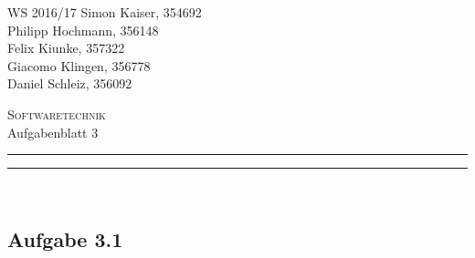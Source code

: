 \documentclass[a4paper,graphics,11pt]{article}
\newcommand\aufgabe[1]{\subsection*{Aufgabe #1}}
\newcommand\aufgabenteil[1]{\subsubsection*{#1}}
\begin{document}
\noindent WS 2016/17        \hfill Simon Kaiser, 354692 \\
\null                                     \hfill Philipp Hochmann, 356148 \\
\null                                     \hfill Felix Kiunke, 357322 \\
\null                                     \hfill Giacomo Klingen, 356778 \\
\null                                     \hfill Daniel Schleiz, 356092 \\

\begin{center}
\Large \textsc{Softwaretechnik} \\   %
\large Aufgabenblatt 3                        %
\end{center}
\begin{center}
\rule[0.5ex]{\textwidth}{0.6pt}\vspace*{-\baselineskip}\vspace{3.2pt}
\rule[0.5ex]{\textwidth}{1.6pt}\\
\end{center}

%
% 

\aufgabe{3.1}


\end{document}
